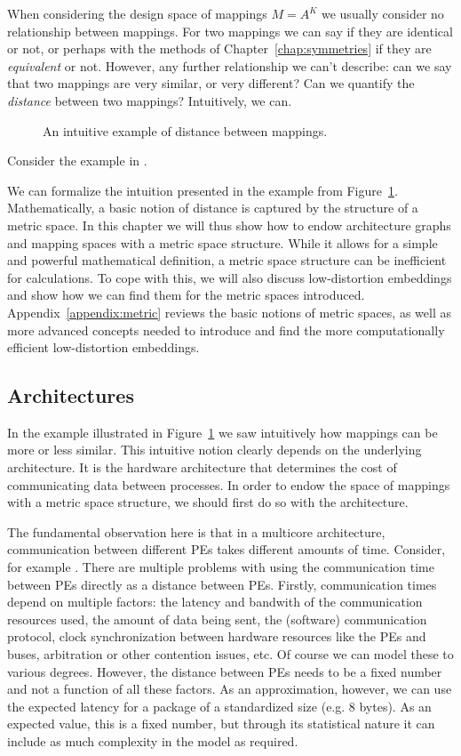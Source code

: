 When considering the design space of mappings $M = A^K$ we usually consider no relationship between mappings. For two mappings we can say if they are identical or not, or perhaps with the methods of Chapter~\ref{chap:symmetries} if they are \emph{equivalent} or not. However, any further relationship we can't describe: can we say that two mappings are very similar, or very different? Can we quantify the \emph{distance} between two mappings? Intuitively, we can.

\begin{figure}[h]
	\centering
   \resizebox{0.55\textwidth}{!}{}
	\caption{An intuitive example of distance between mappings.}
	\label{fig:intuition_metric}
\end{figure}
Consider the example in .

We can formalize the intuition presented in the example from Figure~\ref{fig:intuition_metric}. Mathematically, a basic notion of distance is captured by the structure of a metric space. 
In this chapter we will thus show how to endow architecture graphs and mapping spaces with a metric space structure. While it allows for a simple and powerful mathematical definition, a metric space structure can be inefficient for calculations. To cope with this, we will also discuss low-distortion embeddings and show how we can find them for the metric spaces introduced.
Appendix~\ref{appendix:metric} reviews the basic notions of metric spaces, as well as more advanced concepts needed to introduce and find the more computationally efficient low-distortion embeddings.

\subsection{Architectures}

In the example illustrated in Figure~\ref{fig:intuition_metric} we saw intuitively how mappings can be more or less similar. This intuitive notion clearly depends on the underlying architecture. It is the hardware architecture that determines the cost of communicating data between processes. In order to endow the space of mappings with a metric space structure, we should first do so with the architecture.

The fundamental observation here is that in a multicore architecture, communication between different PEs takes different amounts of time. Consider, for example .
There are multiple problems with using the communication time between PEs directly as a distance between PEs. Firstly, communication times depend on multiple factors: the latency and bandwith of the communication resources used, the amount of data being sent, the (software) communication protocol, clock synchronization between hardware resources like the PEs and buses, arbitration or other contention issues, etc.
Of course we can model these to various degrees. However, the distance between PEs needs to be a fixed number and not a function of all these factors. As an approximation, however, we can use the expected latency for a package of a standardized size (e.g. 8 bytes). As an expected value, this is a fixed number, but through its statistical nature it can include as much complexity in the model as required.


